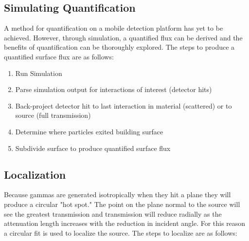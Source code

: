 \subsection{Simulating Quantification}
\noindent A method for quantification on a mobile detection platform has yet to be achieved. However, through simulation, a quantified flux can be derived and the benefits of quantification can be thoroughly explored. The steps to produce a quantified surface flux are as follows:

\begin{enumerate}
	\item Run Simulation
	\item Parse simulation output for interactions of interest (detector hits)
	\item Back-project detector hit to last interaction in material (scattered) or to source (full transmission)
  \item Determine where particles exited building surface
  \item Subdivide surface to produce quantified surface flux
\end{enumerate}

\subsection{Localization}
\noindent Because gammas are generated isotropically when they hit a plane they will produce a circular "hot spot." The point on the plane normal to the source will see the greatest transmission and transmission will reduce radially as the attenuation length increases with the reduction in incident angle. For this reason a circular fit is used to localize the source. The steps to localize are as follows:

